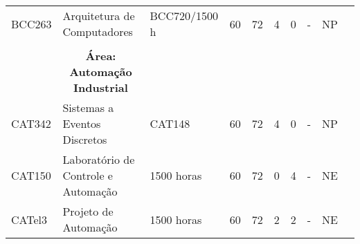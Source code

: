 \begin{table}[tbp]
{\begin{tabular}{llllllllll}
			\multicolumn{1}{|l|}{BCC263}                    & \multicolumn{1}{l|}{Arquitetura de Computadores}                                          & \multicolumn{1}{l|}{BCC720/1500 h}          & \multicolumn{1}{l|}{60}                                                           & \multicolumn{1}{l|}{72}               & \multicolumn{1}{l|}{4}  & \multicolumn{1}{l|}{0}  & \multicolumn{1}{l|}{-}                & \multicolumn{1}{l|}{NP}            &  \\ \cline{1-9}
			\multicolumn{1}{|l|}{}                          & \multicolumn{1}{l|}{}                                                                     & \multicolumn{1}{l|}{}                       & \multicolumn{1}{l|}{}                                                             & \multicolumn{1}{l|}{}                 & \multicolumn{1}{l|}{}   & \multicolumn{1}{l|}{}   & \multicolumn{1}{l|}{}                 & \multicolumn{1}{l|}{}              &  \\ \cline{1-9}
			\multicolumn{1}{|l|}{}                          & \multicolumn{1}{c|}{\textbf{Área: Automação Industrial}}                                  & \multicolumn{1}{l|}{}                       & \multicolumn{1}{l|}{}                                                             & \multicolumn{1}{l|}{}                 & \multicolumn{1}{l|}{}   & \multicolumn{1}{l|}{}   & \multicolumn{1}{l|}{}                 & \multicolumn{1}{l|}{}              &  \\ \cline{1-9}
			\multicolumn{1}{|l|}{CAT342}                    & \multicolumn{1}{l|}{Sistemas a Eventos Discretos}                                         & \multicolumn{1}{l|}{CAT148}                 & \multicolumn{1}{l|}{60}                                                           & \multicolumn{1}{l|}{72}               & \multicolumn{1}{l|}{4}  & \multicolumn{1}{l|}{0}  & \multicolumn{1}{l|}{-}                & \multicolumn{1}{l|}{NP}            &  \\ \cline{1-9}
			\multicolumn{1}{|l|}{CAT150}                    & \multicolumn{1}{l|}{Laboratório de Controle e Automação}                                  & \multicolumn{1}{l|}{1500 horas}             & \multicolumn{1}{l|}{60}                                                           & \multicolumn{1}{l|}{72}               & \multicolumn{1}{l|}{0}  & \multicolumn{1}{l|}{4}  & \multicolumn{1}{l|}{-}                & \multicolumn{1}{l|}{NE}            &  \\ \cline{1-9}
			\multicolumn{1}{|l|}{CATel3}                    & \multicolumn{1}{l|}{Projeto de Automação}                                                 & \multicolumn{1}{l|}{1500 horas}             & \multicolumn{1}{l|}{60}                                                           & \multicolumn{1}{l|}{72}               & \multicolumn{1}{l|}{2}  & \multicolumn{1}{l|}{2}  & \multicolumn{1}{l|}{-}                & \multicolumn{1}{l|}{NE}            &  \\ \cline{1-9}

\end{tabular}}
\end{table}
